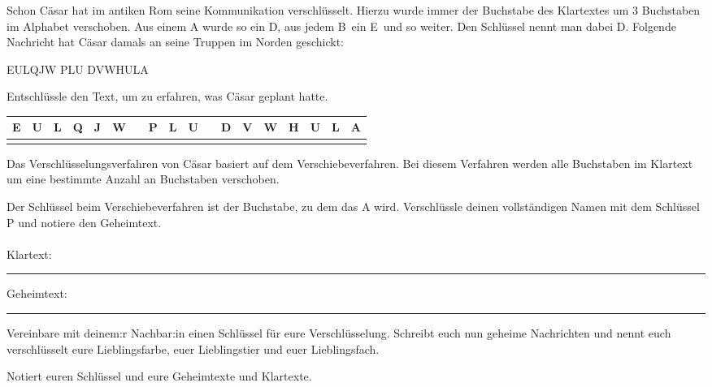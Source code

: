 \documentclass[a4paper, 12pt]{article}
\begin{document}
\large
\TITEL

Schon Cäsar hat im antiken Rom seine Kommunikation verschlüsselt. Hierzu wurde immer der Buchstabe des Klartextes um 3 Buchstaben im Alphabet verschoben. Aus einem \glqq A\grqq{} wurde so ein \glqq D\grqq , aus jedem \glqq B\grqq\ ein \glqq E\grqq\ und so weiter. Den Schlüssel nennt man dabei \glqq D\grqq . Folgende Nachricht hat Cäsar damals an seine Truppen im Norden geschickt:
\begin{center}
	EULQJW PLU DVWHULA
\end{center}
Entschlüssle den Text, um zu erfahren, was Cäsar geplant hatte.
\begin{large}
	\begin{center}
	\begin{tabular}{|p{12pt}|p{12pt}|p{12pt}|p{12pt}|p{12pt}|p{12pt}|p{12pt}|p{12pt}|p{12pt}|p{12pt}|p{12pt}|p{12pt}|p{12pt}|p{12pt}|p{12pt}|p{12pt}|p{12pt}|p{12pt}|}
	\hline
	E&U&L&Q&J&W&&P&L&U&&D&V&W&H&U&L&A\\\hline
	&&&&&&&&&&&&&&&&&\\\hline
\end{tabular}
\end{center}
\end{large}


Das Verschlüsselungsverfahren von Cäsar basiert auf dem \glqq Verschiebeverfahren\grqq{}. Bei diesem Verfahren werden alle Buchstaben im Klartext um eine bestimmte Anzahl an Buchstaben verschoben.

Der Schlüssel beim Verschiebeverfahren ist der Buchstabe, zu dem das \glqq A\grqq{} wird. Verschlüssle deinen vollständigen Namen mit dem Schlüssel \glqq P\grqq{} und notiere den Geheimtext.
\\
\\
Klartext:\vspace{1pt}\hrule

\vspace{1cm}

Geheimtext:\vspace{1pt}\hrule
\newpage

Vereinbare mit deinem:r Nachbar:in einen Schlüssel für eure Verschlüsselung. Schreibt euch nun geheime Nachrichten und nennt euch verschlüsselt eure Lieblingsfarbe, euer Lieblingstier und euer Lieblingsfach.

Notiert euren Schlüssel und eure Geheimtexte und Klartexte.
\end{document}
